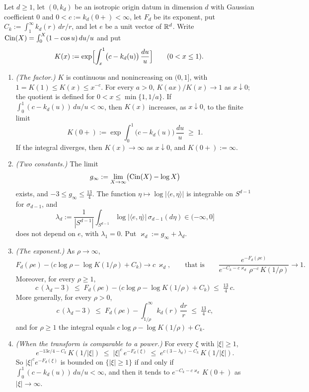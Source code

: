 \begin{proposition}\label{prop:isotropic-exponent-profile}
Let $d \ge 1$, let $(0,k_d)$ be an isotropic origin datum in dimension $d$ with Gaussian
coefficient $0$ and $0 < c := k_d(0{+}) < \infty$, let $F_d$ be its exponent, put
$C_k := \int_1^\infty k_d(r)\,dr/r$, and let $e$ be a unit vector of $\mathbb{R}^d$. Write
$\operatorname{Cin}(X) = \int_0^X (1 - \cos u)\,du/u$ and put
\[
  K(x) := \exp\Bigl[\int_x^1 \bigl(c - k_d(u)\bigr)\,\frac{du}{u}\Bigr] \qquad (0 < x \le 1) .
\]
\begin{enumerate}
\item \emph{(The factor.)} $K$ is continuous and nonincreasing on $(0,1]$, with
$1 = K(1) \le K(x) \le x^{-c}$. For every $a > 0$, $K(ax)/K(x) \to 1$ as $x \downarrow 0$; the
quotient is defined for $0 < x \le \min\{1, 1/a\}$. If $\int_0^1 (c - k_d(u))\,du/u < \infty$,
then $K(x)$ increases, as $x \downarrow 0$, to the finite limit
\[
  K(0{+}) := \exp\int_0^1 \bigl(c - k_d(u)\bigr)\,\frac{du}{u} \;\ge\; 1 .
\]
If the integral diverges, then $K(x) \to \infty$ as $x \downarrow 0$, and $K(0{+}) := \infty$.
\item \emph{(Two constants.)} The limit
\[
  g_\infty := \lim_{X\to\infty}\bigl(\operatorname{Cin}(X) - \log X\bigr)
\]
exists, and $-3 \le g_\infty \le \tfrac{13}{4}$. The function
$\eta \mapsto \log|\langle e,\eta\rangle|$ is integrable on $S^{d-1}$ for $\sigma_{d-1}$, and
\[
  \lambda_d := \frac{1}{|S^{d-1}|}\int_{S^{d-1}}\log|\langle e,\eta\rangle|\,\sigma_{d-1}(d\eta)
  \in (-\infty, 0]
\]
does not depend on $e$, with $\lambda_1 = 0$. Put $\varkappa_d := g_\infty + \lambda_d$.
\item \emph{(The exponent.)} As $\rho \to \infty$,
\[
  F_d(\rho e) - \bigl(c\log\rho - \log K(1/\rho) + C_k\bigr) \to c\,\varkappa_d ,
  \qquad\text{that is}\qquad
  \frac{e^{-F_d(\rho e)}}{e^{-C_k - c\varkappa_d}\,\rho^{-c}\,K(1/\rho)} \to 1 .
\]
Moreover, for every $\rho \ge 1$,
\[
  c\,(\lambda_d - 3) \;\le\; F_d(\rho e) - \bigl(c\log\rho - \log K(1/\rho) + C_k\bigr)
  \;\le\; \tfrac{13}{4}\,c .
\]
More generally, for every $\rho > 0$,
\[
  c\,(\lambda_d - 3) \;\le\; F_d(\rho e) - \int_{1/\rho}^{\infty}k_d(r)\,\frac{dr}{r}
  \;\le\; \tfrac{13}{4}\,c ,
\]
and for $\rho \ge 1$ the integral equals $c\log\rho - \log K(1/\rho) + C_k$.
\item \emph{(When the transform is comparable to a power.)} For every $\xi$ with $|\xi| \ge 1$,
\[
  e^{-13c/4 - C_k}\,K(1/|\xi|) \;\le\; |\xi|^{c}\,e^{-F_d(\xi)} \;\le\;
  e^{c(3-\lambda_d) - C_k}\,K(1/|\xi|) .
\]
So $|\xi|^{c}e^{-F_d(\xi)}$ is bounded on $\{|\xi| \ge 1\}$ if and only if
$\int_0^1 (c - k_d(u))\,du/u < \infty$, and then it tends to
$e^{-C_k - c\varkappa_d}\,K(0{+})$ as $|\xi| \to \infty$.
\end{enumerate}
\end{proposition}

